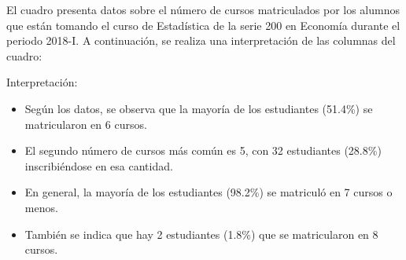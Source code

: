 \documentclass[
  jou,
  floatsintext,
  longtable,
  a4paper,
  nolmodern,
  notxfonts,
  notimes,
  12pt,
  colorlinks=true,linkcolor=blue,citecolor=blue,urlcolor=blue]{apa7}
\providecommand{\tightlist}{%
  \setlength{\itemsep}{0pt}\setlength{\parskip}{0pt}}
\begin{document}
El cuadro presenta datos sobre el número de cursos matriculados por los
alumnos que están tomando el curso de Estadística de la serie 200 en
Economía durante el periodo 2018-I. A continuación, se realiza una
interpretación de las columnas del cuadro:

Interpretación:

\begin{itemize}
\tightlist
\item
  Según los datos, se observa que la mayoría de los estudiantes (51.4\%)
  se matricularon en 6 cursos.
\item
  El segundo número de cursos más común es 5, con 32 estudiantes
  (28.8\%) inscribiéndose en esa cantidad.
\item
  En general, la mayoría de los estudiantes (98.2\%) se matriculó en 7
  cursos o menos.
\item
  También se indica que hay 2 estudiantes (1.8\%) que se matricularon en
  8 cursos.
\end{itemize}
\end{document}
